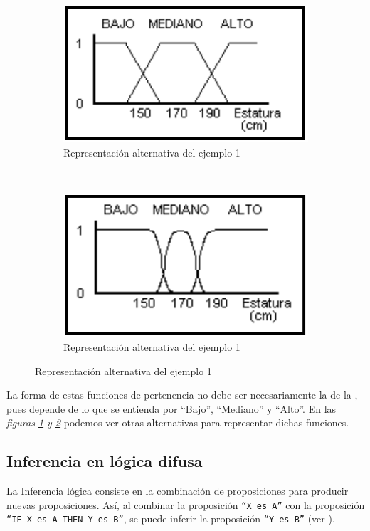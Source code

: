 \begin{figure}[H]
	\centering
	\begin{subfigure}[b]{0.4\textwidth}
		\centering
		\includegraphics[scale = 0.5]{images/fuzzy_example_alt1.png}
		\caption{Representación alternativa del ejemplo 1}
		\label{fig:fuzzy1}
	\end{subfigure}
	~ %
	\begin{subfigure}[b]{0.4\textwidth}
		\centering
		\includegraphics[scale = 0.5]{images/fuzzy_example_alt2.png}
		\caption{Representación alternativa del ejemplo 1}
		\label{fig:fuzzy2}
	\end{subfigure}
	\label{fig:alternativas}	
\end{figure}
La forma de
estas funciones de pertenencia no debe ser necesariamente la de la ,
pues depende de lo que se entienda por ``Bajo'', ``Mediano'' y ``Alto''.
En las \textit{figuras \ref{fig:fuzzy1} y \ref{fig:fuzzy2}} podemos ver otras alternativas para representar dichas funciones.

\subsection{Inferencia en lógica difusa}
La Inferencia lógica consiste en la combinación de proposiciones para
producir nuevas proposiciones. Así, al combinar la proposición \texttt{``X es A''} con
la proposición \texttt{``IF X es A THEN Y es B''}, se puede inferir la proposición \texttt{``Y es
B''} (ver ).

